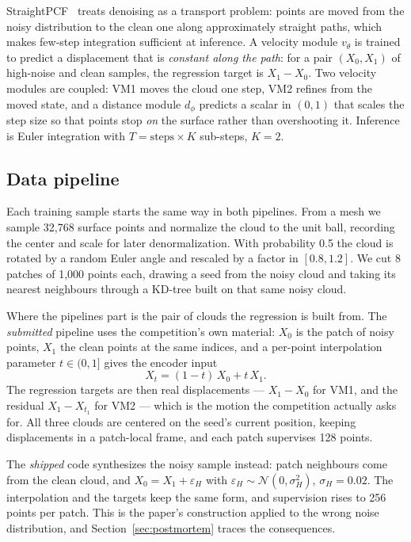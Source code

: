 \documentclass{article}
\begin{document}
StraightPCF~\citep{straightpcf} treats denoising as a transport problem: points are moved from the noisy distribution to the clean one along approximately straight paths, which makes few-step integration sufficient at inference. A velocity module $v_\theta$ is trained to predict a displacement that is \emph{constant along the path}: for a pair $(X_0, X_1)$ of high-noise and clean samples, the regression target is $X_1 - X_0$. Two velocity modules are coupled: VM1 moves the cloud one step, VM2 refines from the moved state, and a distance module $d_\phi$ predicts a scalar in $(0,1)$ that scales the step size so that points stop \emph{on} the surface rather than overshooting it. Inference is Euler integration with $T = \text{steps} \times K$ sub-steps, $K=2$.

\subsection{Data pipeline}

Each training sample starts the same way in both pipelines. From a mesh we sample 32{,}768 surface points and normalize the cloud to the unit ball, recording the center and scale for later denormalization. With probability 0.5 the cloud is rotated by a random Euler angle and rescaled by a factor in $[0.8, 1.2]$. We cut 8 patches of 1{,}000 points each, drawing a seed from the noisy cloud and taking its nearest neighbours through a KD-tree built on that same noisy cloud.

Where the pipelines part is the pair of clouds the regression is built from. The \emph{submitted} pipeline uses the competition's own material: $X_0$ is the patch of noisy points, $X_1$ the clean points at the same indices, and a per-point interpolation parameter $t \in (0,1]$ gives the encoder input
\begin{equation}
X_t = (1-t)\,X_0 + t\,X_1 .
\end{equation}
The regression targets are then real displacements --- $X_1 - X_0$ for VM1, and the residual $X_1 - X_{t_1}$ for VM2 --- which is the motion the competition actually asks for. All three clouds are centered on the seed's current position, keeping displacements in a patch-local frame, and each patch supervises 128 points.

The \emph{shipped} code synthesizes the noisy sample instead: patch neighbours come from the clean cloud, and $X_0 = X_1 + \varepsilon_H$ with $\varepsilon_H \sim \mathcal{N}(0, \sigma_H^2)$, $\sigma_H = 0.02$. The interpolation and the targets keep the same form, and supervision rises to 256 points per patch. This is the paper's construction applied to the wrong noise distribution, and Section~\ref{sec:postmortem} traces the consequences.
\end{document}
